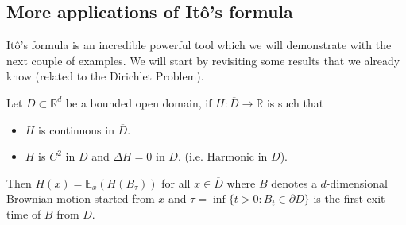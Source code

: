 \documentclass[../mainfile.tex]{subfiles}
\begin{document}
\subsection{More applications of Itô's formula}
Itô's formula is an incredible powerful tool which we will demonstrate with the next couple of examples. We will start by revisiting some results that we already know (related to the Dirichlet Problem).
\begin{prop} Let $D \subset \mathbb{R}^d$ be a bounded open domain, if $H: \overline{D} \to \mathbb{R}$ is such that 
\begin{itemize}
\item $H$ is continuous in $\overline{D}$.
\item $H$ is $C^2$ in $D$ and $\Delta H=0$ in $D$. (i.e. Harmonic in $D$).
\end{itemize}
Then $H(x)= \mathbb{E}_x(H(B_\tau))$ for all $x \in \overline{D}$ where $B$ denotes a $d$-dimensional Brownian motion started from $x$ and $\tau = \inf \{ t > 0 : B_t \in \partial D\}$ is the first exit time of $B$ from $D$.
\end{prop}
\end{document}
